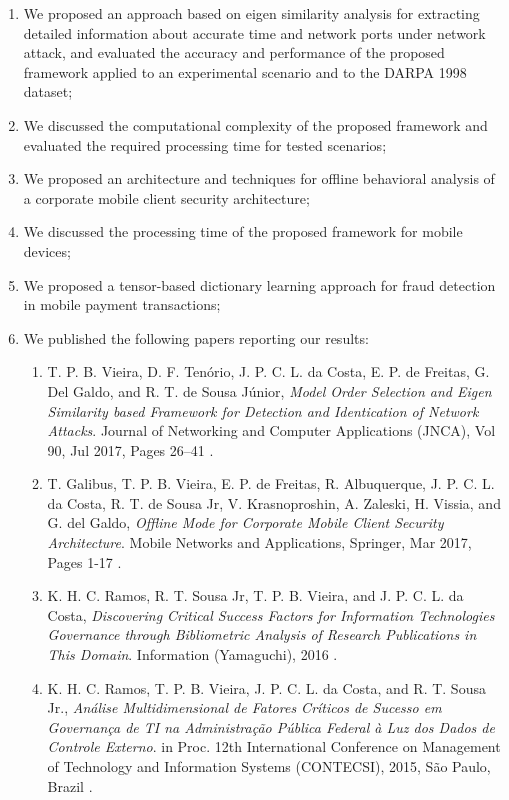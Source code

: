 \begin{enumerate}
	\item We proposed an approach based on eigen similarity analysis for extracting detailed information about accurate time and network ports under network attack, and evaluated the accuracy and performance of the proposed framework applied to an experimental scenario and to the DARPA 1998 dataset;
	\item We discussed the computational complexity of the proposed framework and evaluated the required processing time for tested scenarios;
	\item We proposed an architecture and techniques for offline behavioral analysis of a corporate mobile client security architecture;
	\item We discussed the processing time of the proposed framework for mobile devices;
	\item We proposed a tensor-based dictionary learning approach for fraud detection in mobile payment transactions;
	\item We published the following papers reporting our results:
	\begin{enumerate}
		\item T. P. B. Vieira, D. F. Ten\'orio, J. P. C. L. da Costa, E. P. de Freitas, G. Del Galdo, and R. T. de Sousa J\'unior, \textit{Model Order Selection and Eigen Similarity based Framework for Detection and Identication of Network Attacks}. Journal of Networking and Computer Applications (JNCA), Vol 90, Jul 2017, Pages 26–41 \cite{vieira2017model}.
		\item T. Galibus, T. P. B. Vieira, E. P. de Freitas, R. Albuquerque, J. P. C. L. da Costa, R. T. de Sousa Jr, V. Krasnoproshin, A. Zaleski, H. Vissia, and G. del Galdo, \textit{Offline Mode for Corporate Mobile Client Security Architecture}. Mobile Networks and Applications, Springer, Mar 2017, Pages 1-17 \cite{galibus2017offline}.
		\item K. H. C. Ramos, R. T. Sousa Jr, T. P. B. Vieira, and J. P. C. L. da Costa, \textit{Discovering Critical Success Factors for Information Technologies Governance through Bibliometric Analysis of Research Publications in This Domain}. Information (Yamaguchi), 2016 \cite{ramos2016information}.
		\item K. H. C. Ramos, T. P. B. Vieira, J. P. C. L. da Costa, and R. T. Sousa Jr., \textit{Análise Multidimensional de Fatores Críticos de Sucesso em Governança de TI na Administração Pública Federal à Luz dos Dados de Controle Externo}. in Proc. 12th International Conference on Management of Technology and Information Systems (CONTECSI), 2015, São Paulo, Brazil \cite{ramos2015}.
	\end{enumerate}
\end{enumerate}


